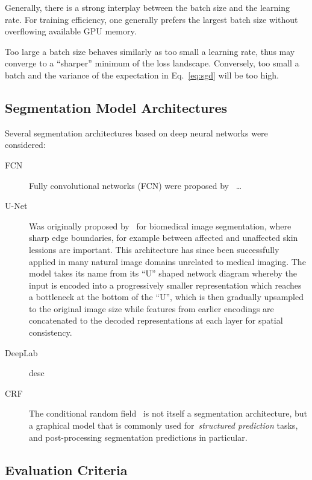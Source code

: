 \documentclass[11pt]{article} %
\begin{document}
Generally, there is a strong interplay between the batch size and the learning
rate. For training efficiency, one generally prefers the largest batch size
without overflowing available GPU memory.

Too large a batch size behaves similarly as too small a learning rate, thus may 
converge to a ``sharper'' minimum of the loss landscape. Conversely, too small 
a batch and the variance of the expectation in Eq.~\eqref{eq:sgd} will be too 
high.

\subsection{Segmentation Model Architectures}

Several segmentation architectures based on deep neural networks were
considered: 

\begin{description}
\item[FCN] Fully convolutional networks (FCN) were proposed 
by~\cite{long2015fully} \dots

\item[U-Net] Was originally proposed by~\cite{ronneberger2015unet} for 
biomedical image segmentation, where sharp edge boundaries, for example between 
affected and unaffected skin lessions are important. This architecture has 
since been successfully applied in many natural image domains unrelated to 
medical imaging. 
The model takes its name from its ``U'' shaped network diagram whereby the
input is encoded into a progressively smaller representation which reaches a 
bottleneck at the bottom of the ``U'', which is then gradually upsampled to the 
original image size while features from earlier encodings are concatenated to 
the decoded representations at each layer for spatial consistency.

\item[DeepLab] desc

\item[CRF] The conditional random field~\cite{krahenbuhl2011efficient} is not
itself a segmentation architecture, but a graphical model that is commonly used
for~\emph{structured prediction} tasks, and post-processing segmentation
predictions in particular.

\end{description}

\subsection{Evaluation Criteria}
\end{document}
